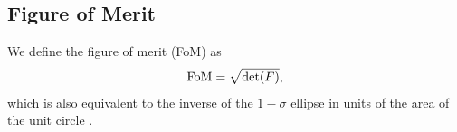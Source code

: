 \documentclass[useAMS,usenatbib]{mn2e}
\begin{document}
\subsection{Figure of Merit}
We define the figure of merit (FoM) as
\begin{equation}
{\rm FoM} = \sqrt{{\rm det}( F )},
\end{equation}  
which is also equivalent to the inverse of the $1-\sigma$ ellipse in units of the area of the unit circle \citep{BASSETT2011, Coe:2009xf}. 
%
%
%
%
%
\end{document}
